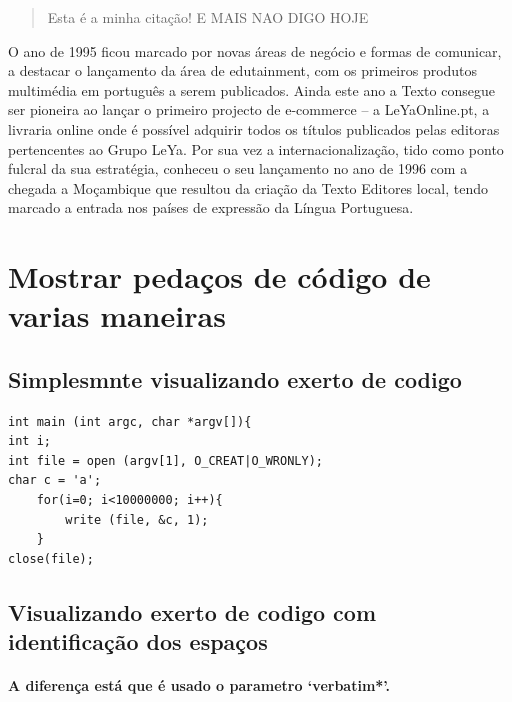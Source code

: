 \documentclass[a4paper,11pt]{article}%
\begin{document}
\begin{quote}
	Esta é a minha citação! \newline 
	E MAIS NAO DIGO HOJE
\end{quote}

O ano de 1995 ficou marcado por novas áreas de negócio e formas de comunicar, a destacar o lançamento da área de edutainment, com os primeiros produtos multimédia em português a serem publicados. Ainda este ano a Texto consegue ser pioneira ao lançar o primeiro projecto de e-commerce – a LeYaOnline.pt, a livraria online onde é possível adquirir todos os títulos publicados pelas editoras pertencentes ao Grupo LeYa. Por sua vez a internacionalização, tido como ponto fulcral da sua estratégia, conheceu o seu lançamento no ano de 1996 com a chegada a Moçambique que resultou da criação da Texto Editores local, tendo marcado a entrada nos países de expressão da Língua Portuguesa.


\newpage
\section{Mostrar pedaços de código de varias maneiras}

\subsection{Simplesmnte visualizando exerto de codigo}
\begin{verbatim}
int main (int argc, char *argv[]){
int i; 
int file = open (argv[1], O_CREAT|O_WRONLY);
char c = 'a'; 
	for(i=0; i<10000000; i++){
		write (file, &c, 1); 
	}
close(file);
\end{verbatim}
\subsection{Visualizando exerto de codigo com identificação dos espaços}
\paragraph {A diferença está que é usado o parametro `verbatim*'.}
\begin{verbatim*}
int main (int argc, char *argv[]){
int i; 
int file = open (argv[1], O_CREAT|O_WRONLY);
char c = `A'; 
	for(i=0; i<10000000; i++){
		write (file, &c, 1); 
	}
close(file);
\end{verbatim*}
\end{document}
